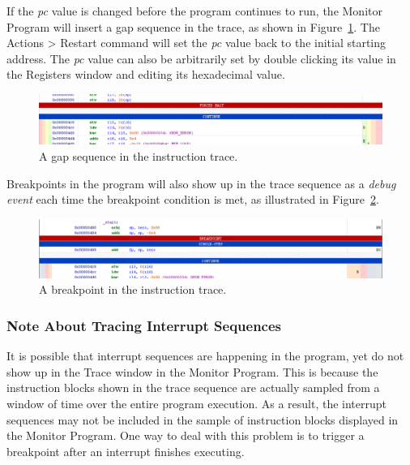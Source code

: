 \documentclass[11pt, twoside, pdftex]{article}
\begin{document}
If the {\it pc} value is changed before the program continues 
to run, the Monitor Program will insert a gap sequence in the
trace, as shown in Figure~\ref{fig:51}. 
The \textsf{Actions > Restart} command will set the {\it pc}
value back to the initial starting address. The {\it pc} 
value can also be arbitrarily set by double clicking its value 
in the \textsf{Registers} window and editing
its hexadecimal value. 

\begin{figure}[H]
   \begin{center}
      \includegraphics[scale=0.5]{screenshots/figure51.png}
   \end{center}
   \caption{A gap sequence in the instruction trace.}
	 \label{fig:51}
\end{figure}

Breakpoints in the program will also show up in the trace
sequence as a {\it debug event} each time the breakpoint
condition is met, as illustrated in Figure~\ref{fig:52}.

\begin{figure}[H]
   \begin{center}
      \includegraphics[scale=0.5]{screenshots/figure52.png}
   \end{center}
   \caption{A breakpoint in the instruction trace.}
	 \label{fig:52}
\end{figure} 

\subsubsection{Note About Tracing Interrupt Sequences}
It is possible that interrupt sequences are happening in the
program, yet do not show up in the Trace window in 
the Monitor Program. This is because the instruction blocks
shown in the trace sequence are actually sampled from a window 
of time over the entire program execution. As a result, the
interrupt sequences may not be included in the sample of
instruction blocks displayed in the Monitor Program. 
One way to deal with this problem is to trigger a breakpoint
after an interrupt finishes executing.
\end{document}
